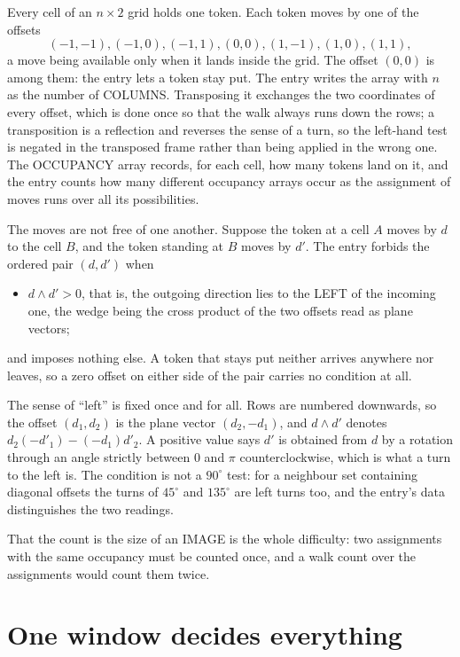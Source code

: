 \documentclass[11pt,a4paper]{article}
\theoremstyle{plain}
\theoremstyle{definition}
\begin{document}
Every cell of an $n\times2$ grid holds one token. Each token moves by one of the offsets
\[
(-1,-1), (-1,0), (-1,1), (0,0), (1,-1), (1,0), (1,1),
\]
a move being available only when it lands inside the grid. The offset $(0,0)$ is among them: the entry lets a token stay put. The entry writes the array with $n$ as the number of COLUMNS. Transposing it exchanges the two coordinates of every offset, which is done once so that the walk always runs down the rows; a transposition is a reflection and reverses the sense of a turn, so the left-hand test is negated in the transposed frame rather than being applied in the wrong one. The OCCUPANCY array
records, for each cell, how many tokens land on it, and the entry counts how many different
occupancy arrays occur as the assignment of moves runs over all its possibilities.

The moves are not free of one another. Suppose the token at a cell $A$ moves by $d$ to the
cell $B$, and the token standing at $B$ moves by $d'$. The entry forbids the ordered pair
$(d,d')$ when
\begin{itemize}
\item $d\wedge d'>0$, that is, the outgoing direction lies to the LEFT of the incoming one, the wedge being the cross product of the two offsets read as plane vectors;
\end{itemize}
and imposes nothing else. A token that stays put neither arrives anywhere nor leaves, so a
zero offset on either side of the pair carries no condition at all.

The sense of ``left'' is fixed once and for all. Rows are numbered downwards, so the offset
$(d_1,d_2)$ is the plane vector $(d_2,-d_1)$, and $d\wedge d'$ denotes
$d_2(-d'_1)-(-d_1)d'_2$. A positive value says $d'$ is obtained from $d$ by a rotation through
an angle strictly between $0$ and $\pi$ counterclockwise, which is what a turn to the left is.
The condition is not a $90^\circ$ test: for a neighbour set containing diagonal offsets the
turns of $45^\circ$ and $135^\circ$ are left turns too, and the entry's data distinguishes the
two readings.

That the count is the size of an IMAGE is the whole difficulty: two assignments with the same
occupancy must be counted once, and a walk count over the assignments would count them twice.

\section{One window decides everything}
\end{document}
